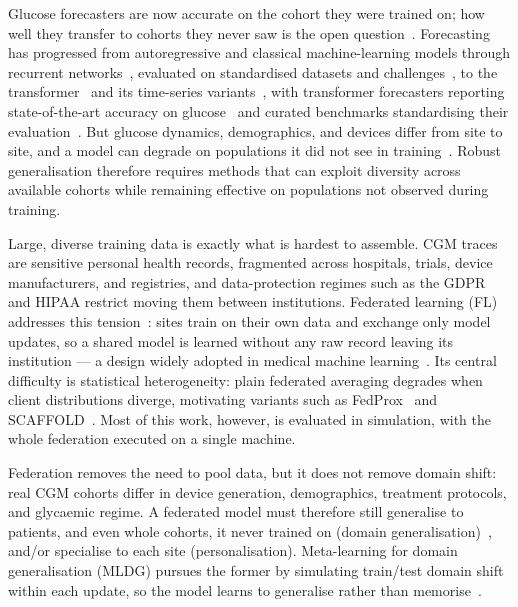 \documentclass[10pt,letterpaper]{article}
\begin{document}
Glucose forecasters are now accurate on the cohort they were trained on; how
well they transfer to cohorts they never saw is the open
question~\cite{ghimire2024generalize}. Forecasting has progressed from
autoregressive and classical machine-learning models through recurrent
networks~\cite{martinsson2020}, evaluated on standardised datasets and
challenges~\cite{marling2020ohio}, to the
transformer~\cite{vaswani2017attention} and its time-series
variants~\cite{zhou2021informer,wu2021autoformer}, with transformer
forecasters reporting state-of-the-art accuracy on
glucose~\cite{sergazinov2023gluformer} and curated benchmarks standardising
their evaluation~\cite{sergazinov2024glucobench}. But glucose dynamics,
demographics, and devices differ from site to site, and a model can degrade
on populations it did not see in training~\cite{farahmand2025glumind}.
Robust generalisation therefore requires methods that can exploit diversity
across available cohorts while remaining effective on populations not
observed during training.

Large, diverse training data is exactly what is hardest to assemble. CGM
traces are sensitive personal health records, fragmented across hospitals,
trials, device manufacturers, and registries, and data-protection regimes
such as the GDPR and HIPAA restrict moving them between institutions.
Federated learning (FL) addresses this tension~\cite{mcmahan2017fedavg}:
sites train on their own data and exchange only model updates, so a shared
model is learned without any raw record leaving its institution --- a
design widely adopted in medical machine
learning~\cite{rieke2020future,sheller2020federated,kaissis2020secure}. Its
central difficulty is statistical heterogeneity: plain federated averaging
degrades when client distributions diverge, motivating variants such as
FedProx~\cite{li2020fedprox} and SCAFFOLD~\cite{karimireddy2020scaffold}.
Most of this work, however, is evaluated in simulation, with the whole
federation executed on a single machine.

Federation removes the need to pool data, but it does not remove domain
shift: real CGM cohorts differ in device generation, demographics,
treatment protocols, and glycaemic regime. A federated model must therefore
still generalise to patients, and even whole cohorts, it never trained on
(domain generalisation)~\cite{zhou2022dgsurvey}, and/or specialise to each
site (personalisation). Meta-learning for domain generalisation (MLDG)
pursues the former by simulating train/test domain shift within each
update, so the model learns to generalise rather than
memorise~\cite{li2018mldg}.
\end{document}

